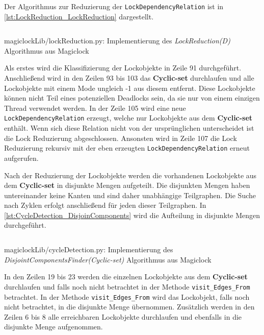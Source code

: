 Der Algorithmus zur Reduzierung der \texttt{LockDependencyRelation} ist in
\cref{lst:LockReduction_LockReduction} dargestellt.
\begin{listing}[ht]
  \inputminted[frame=lines,linenos,firstline=90]{python}{./Python/magiclockLib/lockReduction.py}
  \caption{magiclockLib/lockReduction.py: Implementierung des \emph{LockReduction(D)} Algorithmus aus Magiclock\autocite[5]{MagicLock}}
  \label{lst:LockReduction_LockReduction}
\end{listing}
Als erstes wird die Klassifizierung der Lockobjekte in Zeile 91 durchgeführt.
Anschließend wird in den Zeilen 93 bis 103 das \textbf{Cyclic-set} durchlaufen
und alle Lockobjekte mit einem Mode ungleich -1 aus diesem entfernt. Diese
Lockobjekte können nicht Teil eines potenziellen Deadlocks sein, da sie nur von
einem einzigen Thread verwendet werden. In der Zeile 105 wird eine neue
\texttt{LockDependencyRelation} erzeugt, welche nur Lockobjekte aus dem
\textbf{Cyclic-set} enthält. Wenn sich diese Relation nicht von der
ursprünglichen unterscheidet ist die Lock Reduzierung abgeschlossen. Ansonsten
wird in Zeile 107 die Lock Reduzierung rekursiv mit der eben erzeugten
\texttt{LockDependencyRelation} erneut aufgerufen.

Nach der Reduzierung der Lockobjekte werden die vorhandenen Lockobjekte aus dem
\textbf{Cyclic-set} in disjunkte Mengen aufgeteilt. Die disjunkten Mengen haben
untereinander keine Kanten und sind daher unabhängige Teilgraphen. Die Suche
nach Zyklen erfolgt anschließend für jeden dieser Teilgraphen. In
\cref{lst:CycleDetection_DisjoinComponents} wird die Aufteilung in disjunkte
Mengen durchgeführt. 
\begin{listing}[ht]
  \inputminted[frame=lines,linenos,firstline=1,lastline=25]{python}{./Python/magiclockLib/cycleDetection.py}
  \caption{magiclockLib/cycleDetection.py: Implementierung des \emph{Disjoint\-Components\-Finder\-(Cyclic-set)} Algorithmus aus Magiclock\autocite[8]{MagicLock}}
  \label{lst:CycleDetection_DisjoinComponents}
\end{listing}
In den Zeilen 19 bis 23 werden die einzelnen Lockobjekte aus dem
\textbf{Cyclic-set} durchlaufen und falls noch nicht betrachtet in der Methode
\texttt{visit\_Edges\_From} betrachtet. In der Methode \texttt{visit\_Edges\_From}
wird das Lockobjekt, falls noch nicht betrachtet, in die disjunkte Menge
übernommen. Zusätzlich werden in den Zeilen 6 bis 8 alle erreichbaren
Lockobjekte durchlaufen und ebenfalls in die disjunkte Menge aufgenommen.

